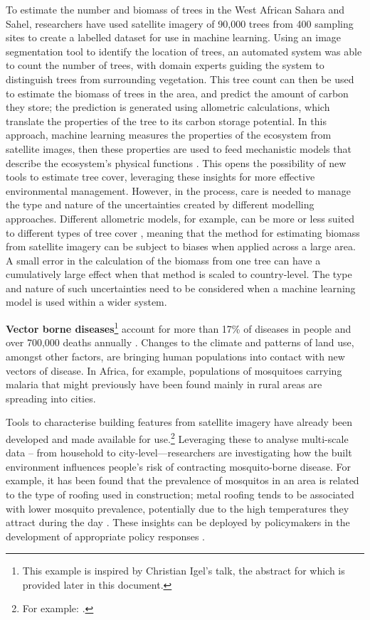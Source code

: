 To estimate the number and biomass of trees in the West African Sahara
and Sahel, researchers have used satellite imagery of 90,000 trees from
400 sampling sites to create a labelled dataset for use in machine
learning. Using an image segmentation tool to identify the location of
trees, an automated system was able to count the number of trees, with
domain experts guiding the system to distinguish trees from surrounding
vegetation. This tree count can then be used to estimate the biomass of
trees in the area, and predict the amount of carbon they store; the
prediction is generated using allometric calculations, which translate
the properties of the tree to its carbon storage potential. In this
approach, machine learning measures the properties of the ecosystem from
satellite images, then these properties are used to feed mechanistic
models that describe the ecosystem's physical functions \citep{Brandt-trees20}. This opens the
possibility of new tools to estimate tree cover, leveraging these
insights for more effective environmental management. However, in the
process, care is needed to manage the type and nature of the
uncertainties created by different modelling approaches. Different
allometric models, for example, can be more or less suited to different
types of tree cover \citep{Hiernaux-allometric23},
meaning that the method for estimating biomass from satellite imagery
can be subject to biases when applied across a large area. A small error
in the calculation of the biomass from one tree can have a cumulatively
large effect when that method is scaled to country-level. The type and
nature of such uncertainties need to be considered when a machine
learning model is used within a wider system.

\textbf{Vector borne diseases}\footnote{This example is inspired by
  Christian Igel's talk, the abstract for which is provided later in
  this document.} account for more than 17\% of diseases in people and
over 700,000 deaths annually \citep{Hernandez-taking22}.
Changes to the climate and patterns of land use, amongst other factors,
are bringing human populations into contact with new vectors of disease.
In Africa, for example, populations of mosquitoes carrying malaria that
might previously have been found mainly in rural areas are spreading
into cities.

Tools to characterise building features from satellite imagery have
already been developed and made available for use.\footnote{For example: \cite{Quinn-mapping21}.} Leveraging these to analyse multi-scale data -- from household to
city-level---researchers are investigating how the built environment
influences people's risk of contracting mosquito-borne disease. For
example, it has been found that the prevalence of mosquitos in an area
is related to the type of roofing used in construction; metal roofing
tends to be associated with lower mosquito prevalence, potentially due
to the high temperatures they attract during the day \citep{Lindsay-reduced19}.
These insights can be deployed by policymakers in the development of
appropriate policy responses \citep{RDA-combat22}.

